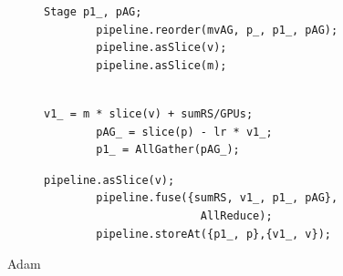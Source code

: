 \begin{figure}[t]
\begin{subfigure}{0.45\textwidth}
\begin{lstlisting}[language=DSL]     
        Stage p1_, pAG;
        pipeline.reorder(mvAG, p_, p1_, pAG); 
        pipeline.asSlice(v); 
        pipeline.asSlice(m); 
        
\end{lstlisting}
\caption{}
\end{subfigure}
\begin{subfigure}{0.45\textwidth}
\begin{lstlisting}[language=DSL]     
        v1_ = m * slice(v) + sumRS/GPUs; 
        pAG_ = slice(p) - lr * v1_; 
        p1_ = AllGather(pAG_);
\end{lstlisting}
\caption{}
\end{subfigure}

\begin{subfigure}{0.45\textwidth}
\begin{lstlisting}[language=DSL]     
        pipeline.asSlice(v); 
        pipeline.fuse({sumRS, v1_, p1_, pAG}, 
                        AllReduce); 
        pipeline.storeAt({p1_, p},{v1_, v});
\end{lstlisting}
\caption{}
\end{subfigure}
\caption{Adam}
\end{figure}



